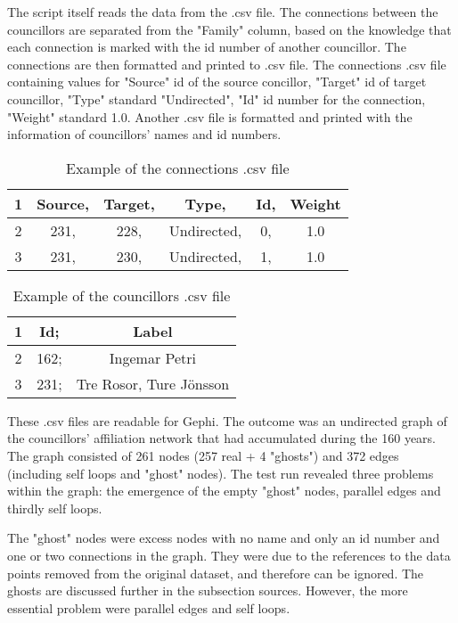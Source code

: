 The script itself reads the data from the .csv file. The connections between the councillors are separated from the "Family" column, based on the knowledge that each connection is marked with the id number of another councillor. The connections are then formatted and printed to .csv file. The connections .csv file containing values for "Source" id of the source concillor, "Target" id of target councillor, "Type" standard "Undirected", "Id" id number for the connection, "Weight" standard 1.0. Another .csv file is formatted and printed with the information of councillors' names and id numbers.

\begin{table}[h]
	\caption{Example of the connections .csv file}
	\centering
	\begin{tabular}{cccccc}
		\hline
		1 &Source, &Target, &Type, &Id, &Weight \\
		\hline
		2 &231, &228, &Undirected, &0, &1.0 \\
		\hline
		3 &231, &230, &Undirected, &1, &1.0 \\
		\hline
	\end{tabular}
\end{table}
\begin{table}[h]
	\caption{Example of the councillors .csv file}
	\centering
	\begin{tabular}{ccc}	
		\hline
		1 &Id; &Label \\
		\hline
		2 &162; &Ingemar Petri \\
		\hline
		3 &231; &Tre Rosor, Ture Jönsson \\
		\hline
	\end{tabular}
\end{table}

These .csv files are readable for Gephi. The outcome was an undirected graph of the councillors' affiliation network that had accumulated during the 160 years. The graph consisted of 261 nodes (257 real + 4 "ghosts") and 372 edges (including self loops and "ghost" nodes). The test run revealed three problems within the graph: the emergence of the empty "ghost" nodes, parallel edges and thirdly self loops. 

The "ghost" nodes were excess nodes with no name and only an id number and one or two connections in the graph. They were due to the references to the data points removed from the original dataset, and therefore can be ignored. The ghosts are discussed further in the subsection sources. However, the more essential problem were parallel edges and self loops.

